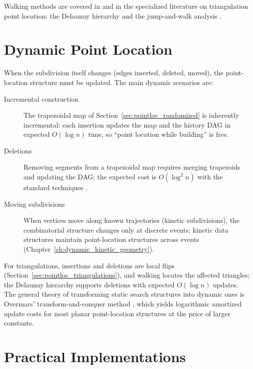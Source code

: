 Walking methods are covered in \cite{berg2008} and in the specialized
literature on triangulation point location: the Delaunay hierarchy
\cite{devillers2002} and the jump-and-walk analysis \cite{mucke1999}.

\section{Dynamic Point Location}
\label{sec:pointloc_dynamic}

When the subdivision itself changes (edges inserted, deleted, moved), the
point-location structure must be updated. The main dynamic scenarios are:

\begin{description}
  \item[Incremental construction] The trapezoidal map of
    Section~\ref{sec:pointloc_randomized} is inherently incremental: each
    insertion updates the map and the history DAG in expected $O(\log n)$
    time, so ``point location while building'' is free.
  \item[Deletions] Removing segments from a trapezoidal map requires
    merging trapezoids and updating the DAG; the expected cost is
    $O(\log^2 n)$ with the standard techniques \cite{overmars1983}.
  \item[Moving subdivisions] When vertices move along known trajectories
    (kinetic subdivisions), the combinatorial structure changes only at
    discrete events; kinetic data structures maintain point-location
    structures across events (Chapter~\ref{ch:dynamic_kinetic_geometry}).
\end{description}

For triangulations, insertions and deletions are local flips
(Section~\ref{sec:pointloc_triangulations}), and walking locates the
affected triangles; the Delaunay hierarchy supports deletions with expected
$O(\log n)$ updates. The general theory of transforming static search
structures into dynamic ones is Overmars' transform-and-conquer method
\cite{overmars1983}, which yields logarithmic amortized update costs for
most planar point-location structures at the price of larger constants.


\section{Practical Implementations}
\label{sec:pointloc_practical}

